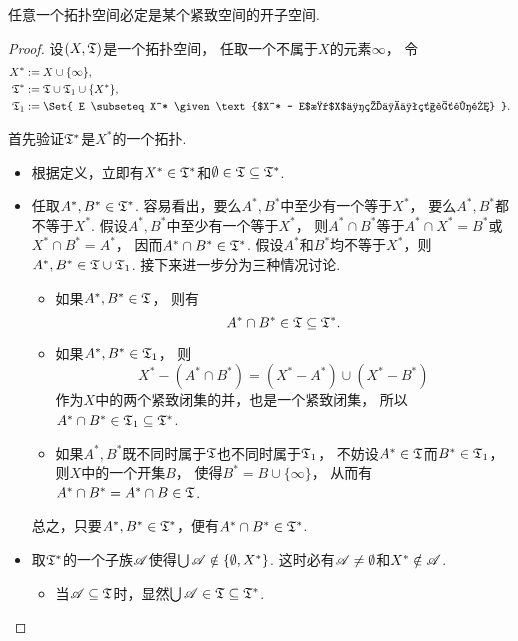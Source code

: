 \begin{theorem}\label{theorem:紧致空间.拓扑空间的一点紧化}
任意一个拓扑空间必定是某个紧致空间的开子空间.
\begin{proof}
设\((X,{\mathfrak T})\)是一个拓扑空间，
任取一个不属于\(X\)的元素\(\infty\)，
令\begin{align*}
	X^* &\defeq X \cup \{\infty\}, \\
	\T^* &\defeq \T \cup \T_1 \cup \{X^*\}, \\
	\T_1 &\defeq \Set{
		E \subseteq X^*
		\given
		\text{$X^* - E$是$X$中的一个紧致闭集}
	}.
\end{align*}

首先验证\({\mathfrak T}^*\)是\(X^*\)的一个拓扑.
\begin{itemize}
	\item 根据定义，立即有\(X^* \in {\mathfrak T}^*\)和\(\emptyset \in {\mathfrak T} \subseteq {\mathfrak T}^*\).

	\item 任取\(A^*,B^* \in {\mathfrak T}^*\).
	容易看出，要么\(A^*,B^*\)中至少有一个等于\(X^*\)，
	要么\(A^*,B^*\)都不等于\(X^*\).
	假设\(A^*,B^*\)中至少有一个等于\(X^*\)，
	则\(A^* \cap B^*\)等于\(A^* \cap X^* = B^*\)或\(X^* \cap B^* = A^*\)，
	因而\(A^* \cap B^* \in {\mathfrak T}^*\).
	假设\(A^*\)和\(B^*\)均不等于\(X^*\)，则\(A^*,B^* \in {\mathfrak T} \cup {\mathfrak T}_1\).
	接下来进一步分为三种情况讨论.
	\begin{itemize}
		\item 如果\(A^*,B^* \in {\mathfrak T}\)，
		则有\begin{equation*}
			A^* \cap B^* \in {\mathfrak T} \subseteq {\mathfrak T}^*.
		\end{equation*}

		\item 如果\(A^*,B^* \in {\mathfrak T}_1\)，
		则\begin{equation*}
			X^* - (A^* \cap B^*)
			= (X^* - A^*) \cup (X^* - B^*)
		\end{equation*}
		作为\(X\)中的两个紧致闭集的并，也是一个紧致闭集，
		所以\(A^* \cap B^* \in {\mathfrak T}_1 \subseteq {\mathfrak T}^*\).

		\item 如果\(A^*,B^*\)既不同时属于\({\mathfrak T}\)也不同时属于\({\mathfrak T}_1\)，
		不妨设\(A^* \in {\mathfrak T}\)而\(B^* \in {\mathfrak T}_1\)，
		则\(X\)中的一个开集\(B\)，
		使得\(B^* = B \cup \{\infty\}\)，
		从而有\(A^* \cap B^*
		= A^* \cap B
		\in {\mathfrak T}\).
	\end{itemize}
	总之，只要\(A^*,B^* \in {\mathfrak T}^*\)，便有\(A^* \cap B^* \in {\mathfrak T}^*\).

	\item 取\({\mathfrak T}^*\)的一个子族\(\mathscr{A}\)使得\(\bigcup \mathscr{A} \notin \{\emptyset,X^*\}\).
	这时必有\(\mathscr{A} \neq \emptyset\)和\(X^* \notin \mathscr{A}\).
	\begin{itemize}
		\item 当\(\mathscr{A} \subseteq {\mathfrak T}\)时，显然\(\bigcup \mathscr{A} \in {\mathfrak T} \subseteq {\mathfrak T}^*\).


\end{itemize}
\end{itemize}
\end{proof}
\end{theorem}
